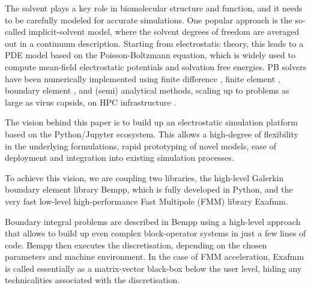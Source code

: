 The solvent plays a key role in biomolecular structure and function, and it needs to be carefully modeled for accurate simulations. 
One popular approach is the so-called implicit-solvent model, where the solvent degrees of freedom are averaged out in a continuum description.
Starting from electrostatic theory, this leads to a PDE model based on the Poisson-Boltzmann equation, which is widely used to compute mean-field electrostatic potentials and solvation free energies.
PB solvers have been numerically implemented using finite difference \cite{delphi, apbs}, finite element \cite{apbs}, boundary element \cite{afmpb, tabi, pygbe}, and (semi) analytical \cite{thg} methods, scaling up to problems as large as virus capsids, on HPC infrastructure \cite{lu}.

The vision behind this paper is to build up an electrostatic simulation platform based on the Python/Jupyter ecosystem. This allows a high-degree of flexibility in the underlying formulations, rapid prototyping of novel models, ease of deployment and integration into existing simulation processes.

To achieve this vision, we are coupling two libraries, the high-level Galerkin boundary element library Bempp, which is fully developed in Python, and the very fast low-level high-performance Fast Multipole (FMM) library Exafmm. 

Boundary integral problems are described in Bempp using a high-level approach that allows to build up even complex block-operator systems in just a few lines of code. Bempp then executes the discretisation, depending on the chosen parameters and machine environment. In the case of FMM acceleration, Exafmm is called essentially as a matrix-vector black-box below the user level, hiding any technicalities associated with the discretisation.

